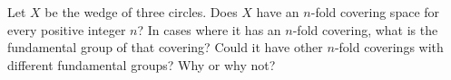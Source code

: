 Let $X$ be the wedge of three circles. Does $X$ have an $n$-fold
covering space for every positive integer $n$? In cases where it has
an $n$-fold covering, what is the fundamental group of that covering?
Could it have other $n$-fold coverings with different fundamental
groups?  Why or why not?
